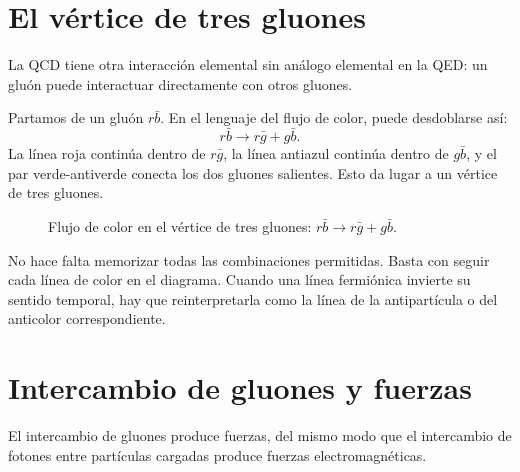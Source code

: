 \section{El vértice de tres gluones}

La QCD tiene otra interacción elemental sin análogo elemental en la QED: un gluón puede interactuar directamente con otros gluones.

Partamos de un gluón \(r\bar b\). En el lenguaje del flujo de color, puede desdoblarse así:
\begin{equation}
r\bar b
\longrightarrow
r\bar g+g\bar b.
\end{equation}
La línea roja continúa dentro de \(r\bar g\), la línea antiazul continúa dentro de \(g\bar b\), y el par verde-antiverde conecta los dos gluones salientes. Esto da lugar a un vértice de tres gluones.

\begin{figure}[h]
\centering
{}
\caption{Flujo de color en el vértice de tres gluones: \(r\bar b\rightarrow r\bar g+g\bar b\).}
\end{figure}

No hace falta memorizar todas las combinaciones permitidas. Basta con seguir cada línea de color en el diagrama. Cuando una línea fermiónica invierte su sentido temporal, hay que reinterpretarla como la línea de la antipartícula o del anticolor correspondiente.

\section{Intercambio de gluones y fuerzas}

El intercambio de gluones produce fuerzas, del mismo modo que el intercambio de fotones entre partículas cargadas produce fuerzas electromagnéticas.

